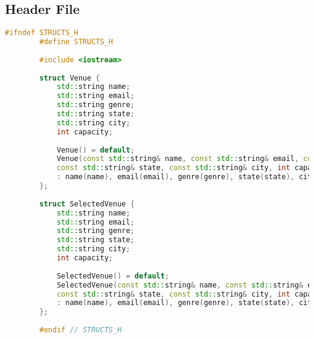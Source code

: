 \documentclass{article}
\begin{document}
	\subsection*{Header File}
	\begin{mdframed}[backgroundcolor=background, hidealllines=false, innerleftmargin=15pt, innerrightmargin=5pt, innertopmargin=0pt, innerbottommargin=-5pt]
	\begin{lstlisting}[language=C++]
		#ifndef STRUCTS_H
		#define STRUCTS_H
		
		#include <iostream>
		
		struct Venue {
			std::string name;
			std::string email;
			std::string genre;
			std::string state;
			std::string city;
			int capacity;
			
			Venue() = default;
			Venue(const std::string& name, const std::string& email, const std::string& genre,
			const std::string& state, const std::string& city, int capacity)
			: name(name), email(email), genre(genre), state(state), city(city), capacity(capacity) {}
		};
		
		struct SelectedVenue {
			std::string name;
			std::string email;
			std::string genre;
			std::string state;
			std::string city;
			int capacity;
			
			SelectedVenue() = default;
			SelectedVenue(const std::string& name, const std::string& email, const std::string& genre,
			const std::string& state, const std::string& city, int capacity)
			: name(name), email(email), genre(genre), state(state), city(city), capacity(capacity) {}
		};
		
		#endif // STRUCTS_H
	\end{lstlisting}
	\end{mdframed}
\end{document}
